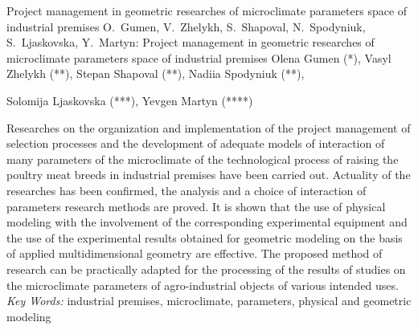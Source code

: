 \documentclass[12pt,twoside]{article}
\begin{document}
	\begin{JGGarticle}
		{Project management in geometric researches of microclimate parameters space of industrial premises}
		{O.\ Gumen, V.\ Zhelykh, S.\ Shapoval, N.\ Spodyniuk, S.\ Ljaskovska, Y.\ Martyn: Project management in geometric researches of microclimate parameters space of industrial premises}
		{Olena Gumen (*), Vasyl Zhelykh (**), Stepan Shapoval (**), Nadiia Spodyniuk (**),}
		{\centerline{Solomija Ljaskovska (***), Yevgen Martyn (****)}}
		{
		}
		
		\begin{JGGabstract}
			Researches on the organization and implementation of the project management of selection processes and the development of adequate models of interaction of many parameters of the microclimate of the technological process of raising the poultry meat breeds in industrial premises have been carried out. Actuality of the researches has been confirmed, the analysis and a choice of interaction of parameters research methods are proved. It is shown that the use of physical modeling with the involvement of the corresponding experimental equipment and the use of the experimental results obtained for geometric modeling on the basis of applied multidimensional geometry are effective. The proposed method of research can be practically adapted for the processing of the results of studies on the microclimate parameters of agro-industrial objects of various intended uses.
			\\[1mm]{\em Key Words:} industrial premises, microclimate, parameters, physical and geometric modeling
		\end{JGGabstract}
		

\end{JGGarticle}
\end{document}
